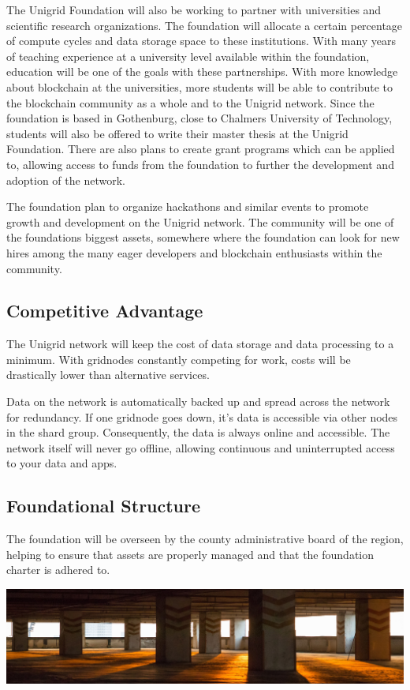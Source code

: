 \documentclass[a4paper,oneside]{article}
\begin{document}
\noindent The Unigrid Foundation will also be working to partner with universities and scientific research organizations. The foundation will allocate a certain percentage of compute cycles and data storage space to these institutions. With many years of teaching experience at a university level available within the foundation, education will be one of the goals with these partnerships. With more knowledge about blockchain at the universities, more students will be able to contribute to the blockchain community as a whole and to the Unigrid network. Since the foundation is based in Gothenburg, close to Chalmers University of Technology, students will also be offered to write their master thesis at the Unigrid Foundation. There are also plans to create grant programs which can be applied to, allowing access to funds from the foundation to further the development and adoption of the network. 

The foundation plan to organize hackathons and similar events to promote growth and development on the Unigrid network. The community will be one of the foundations biggest assets, somewhere where the foundation can look for new hires among the many eager developers and blockchain enthusiasts within the community.

\subsection{Competitive Advantage}
The Unigrid network will keep the cost of data storage and data processing to a minimum. With gridnodes constantly competing for work, costs will be drastically lower than alternative services.

\noindent Data on the network is automatically backed up and spread across the network for redundancy. If one gridnode goes down, it's data is accessible via other nodes in the shard group. Consequently, the data is always online and accessible. The network itself will never go offline, allowing continuous and uninterrupted access to your data and apps.

\subsection{Foundational Structure}
The foundation will be overseen by the county administrative board of the region, helping to ensure that assets are properly managed and that the foundation charter is adhered to.

\vspace{0.05cm}
\begin{mdframed}[style=textimage]
	\includegraphics[width=381pt]{foundation}
\end{mdframed}
\end{document}
